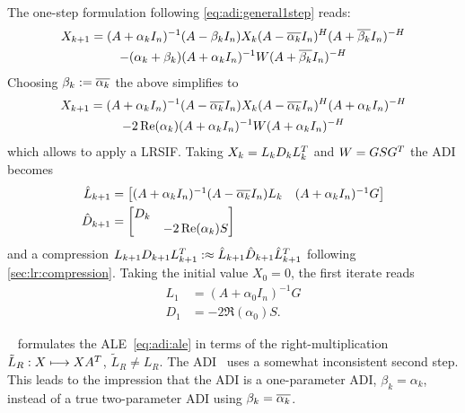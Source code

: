 The one-step formulation following \eqref{eq:adi:general1step} reads:
\begin{multline*}
  X_{k+1} =
  (A + \alpha_k I_n)^{-1}
  (A - \beta_k I_n)
  X_k
  (A - \conj{\alpha_k} I_n)^\HT
  (A + \conj{\beta_k} I_n)^{-H}
  \\
  - (\alpha_k + \beta_k)
  (A + \alpha_k I_n)^{-1}
  W
  (A + \conj{\beta_k} I_n)^{-\HT}
\end{multline*}
Choosing $\beta_k := \conj{\alpha_k}$
the above simplifies to
\begin{multline*}
  X_{k+1} =
  (A + \alpha_k I_n)^{-1}
  (A - \conj{\alpha_k} I_n)
  X_k
  (A - \conj{\alpha_k} I_n)^\HT
  (A + \alpha_k I_n)^{-H}
  \\
  - 2\Re(\alpha_k)
  (A + \alpha_k I_n)^{-1}
  W
  (A + \alpha_k I_n)^{-\HT}
\end{multline*}
which allows to apply a \ac{LRSIF}.
Taking $X_k = L_k D_k L_k^T$ and $W = GSG^T$
the \ac{ADI} becomes
\begin{align*}
  \hat L_{k+1} &= \begin{bmatrix}
    (A+\alpha_k I_n)^{-1} (A - \conj{\alpha_k} I_n) L_k &
    (A+\alpha_k I_n)^{-1} G
  \end{bmatrix} \\
  \hat D_{k+1} &= \begin{bmatrix}
    D_k \\
    & -2\Re(\alpha_k) S
  \end{bmatrix}
\end{align*}
and a compression $L_{k+1} D_{k+1} L_{k+1}^T :\approx \hat L_{k+1} \hat D_{k+1} \hat L_{k+1}^T$
following \autoref{sec:lr:compression}.
Taking the initial value $X_0 = 0$, the first iterate reads
\begin{align*}
  L_1 &= (A+\alpha_0 I_n)^{-1} G \\
  D_1 &= -2\Re(\alpha_0) S
  .
\end{align*}

\begin{remark}
  \citeauthor{Lang2017}~\cite{Lang2017} formulates the \ac{ALE}~\eqref{eq:adi:ale} in terms of the
  right-multiplication $\tilde L_R :X \longmapsto XA^T$, $\tilde L_R \neq L_R$.
  The ADI~\cite[Equation~(2.23)]{Lang2017} uses a somewhat inconsistent second step.
  This leads to the impression that the ADI is a one-parameter ADI, $\beta_k=\alpha_k$,
  instead of a true two-parameter ADI using $\beta_k = \conj{\alpha_k}$.
\end{remark}


